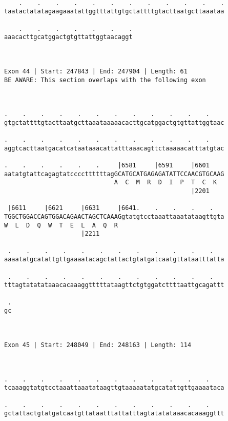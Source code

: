 \documentclass{article}
\begin{document}
\begin{Verbatim}
  
    .    .    .    .    .    .    .    .    .    .    .    .
taatactatatagaagaaatattggtttattgtgctattttgtacttaatgcttaaataa
                                                            
    .    .    .    .    .    .    .
aaacacttgcatggactgtgttattggtaacaggt
                                   
                                   
 
Exon 44 | Start: 247843 | End: 247904 | Length: 61
BE AWARE: This section overlaps with the following exon



.    .    .    .    .    .    .    .    .    .    .    .    
gtgctattttgtacttaatgcttaaataaaaacacttgcatggactgtgttattggtaac
                                                            
.    .    .    .    .    .    .    .    .    .    .    .    
aggtcacttaatgacatcataataaacattatttaaacagttctaaaaacatttatgtac
                                                            
.    .    .    .    .    .     |6581     |6591     |6601    
aatatgtattcagagtatccccttttttagGCATGCATGAGAGATATTCCAACGTGCAAG
                              A  C  M  R  D  I  P  T  C  K  
                                                   |2201    
  
 |6611     |6621     |6631     |6641.    .    .    .    .   
TGGCTGGACCAGTGGACAGAACTAGCTCAAAGgtatgtcctaaattaaatataagttgta
W  L  D  Q  W  T  E  L  A  Q  R                             
                     |2211                                  
  
 .    .    .    .    .    .    .    .    .    .    .    .   
aaaatatgcatattgttgaaaatacagctattactgtatgatcaatgttataatttatta
                                                            
 .    .    .    .    .    .    .    .    .    .    .    .   
tttagtatatataaacacaaaggtttttataagttctgtggatcttttaattgcagattt
                                                            
 .
gc
  
  
 
Exon 45 | Start: 248049 | End: 248163 | Length: 114



.    .    .    .    .    .    .    .    .    .    .    .    
tcaaaggtatgtcctaaattaaatataagttgtaaaaatatgcatattgttgaaaataca
                                                            
.    .    .    .    .    .    .    .    .    .    .    .    
gctattactgtatgatcaatgttataatttattatttagtatatataaacacaaaggttt
                                                            

\end{Verbatim}
\end{document}
